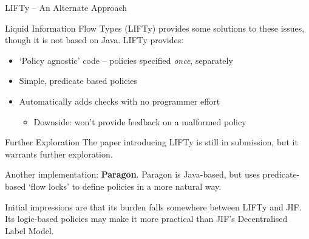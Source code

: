 \begin{frame}[fragile]{LIFTy -- An Alternate Approach}
	
	Liquid Information Flow Types (LIFTy) provides some solutions to these issues, though it is not based on Java. LIFTy provides:
	
	\begin{itemize}
		\item `Policy agnostic' code -- policies specified \textit{once}, separately
		\item Simple, predicate based policies
		\item Automatically adds checks with no programmer effort
		\begin{itemize}
			\item Downside: won't provide feedback on a malformed policy
		\end{itemize}
	\end{itemize}
	
%
	
	
\end{frame}

\begin{frame}{Further Exploration}
	The paper introducing LIFTy is still in submission, but it warrants further exploration.
	
	Another implementation: \textbf{Paragon}. Paragon is Java-based, but uses predicate-based `flow locks' to define policies in a more natural way.
	
	Initial impressions are that its burden falls somewhere between LIFTy and JIF. Its logic-based policies may make it more practical than JIF's Decentralised Label Model.
\end{frame}


